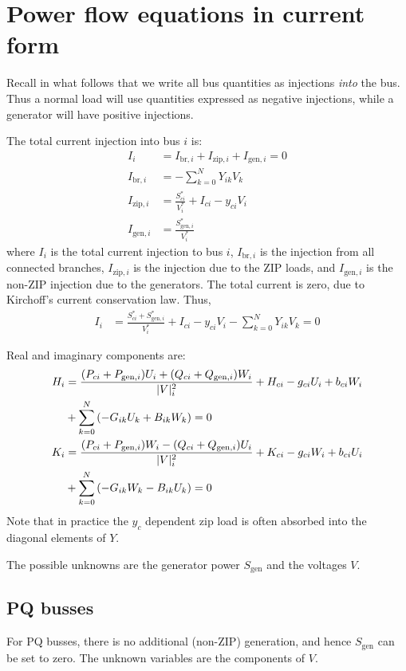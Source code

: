 \documentclass[11pt]{article}
\newcommand{\Vr}{\ensuremath{U}}
\newcommand{\Vi}{\ensuremath{W}}
\newcommand{\Ir}{\ensuremath{H}}
\newcommand{\Ii}{\ensuremath{K}}
\begin{document}
\section{Power flow equations in current form}
Recall in what follows that we write all bus quantities as injections \emph{into} the bus. Thus a normal load will use quantities expressed as negative injections, while a generator will have positive injections.

The total current injection into bus $i$ is:
\begin{align}
I_i &= I_{\text{br}, i} + I_{\text{zip},i} + I_{\text{gen}, i} = 0\\
I_{\text{br},i} &= -\sum_{k=0}^NY_{ik}V_k \\
I_{\text{zip},i} &= \frac{S^*_{ci}}{V^*_i} + I_{ci} - y_{ci}V_i \\
I_{\text{gen},i} &= \frac{S^*_{\text{gen},i}}{V^*_i}
\end{align}
where $I_i$ is the total current injection to bus $i$, $I_{\text{br},i}$ is the injection from all connected branches, $I_{\text{zip},i}$ is the injection due to the ZIP loads, and $I_{\text{gen},i}$ is the non-ZIP injection due to the generators.
The total current is zero, due to Kirchoff's current conservation law. Thus,
\begin{align}
I_i &= \frac{S^*_{ci} + S^*_{\text{gen},i}}{V^*_i} + I_{ci} - y_{ci}V_i - \sum_{k=0}^NY_{ik}V_k = 0
\end{align}

Real and imaginary components are:
\begin{align}
	\Ir_i &= \frac{(P_{ci} + P_{\text{gen},i})\Vr_i + (Q_{ci} + Q_{\text{gen},i})\Vi_i}{|V|^2_i} + \Ir_{ci} -g_{ci}\Vr_i + b_{ci}\Vi_i \notag \\
	&+ \sum_{k=0}^N\left(-G_{ik}\Vr_k + B_{ik}\Vi_k\right) = 0\\
	\Ii_i &= \frac{(P_{ci} + P_{\text{gen},i})\Vi_i - (Q_{ci} + Q_{\text{gen},i})\Vr_i}{|V|^2_i} + \Ii_{ci} -g_{ci}\Vi_i + b_{ci}\Vr_i \notag \\
	&+ \sum_{k=0}^N\left(-G_{ik}\Vi_k - B_{ik}\Vr_k\right) = 0
\end{align}
Note that in practice the $y_c$ dependent zip load is often absorbed into the diagonal elements of $Y$.

The possible unknowns are the generator power $S_{\text{gen}}$ and the voltages $V$.

\subsection{PQ busses}
For PQ busses, there is no additional (non-ZIP) generation, and hence $S_{\text{gen}}$ can be set to zero. The unknown variables are the components of $V$.
\end{document}
